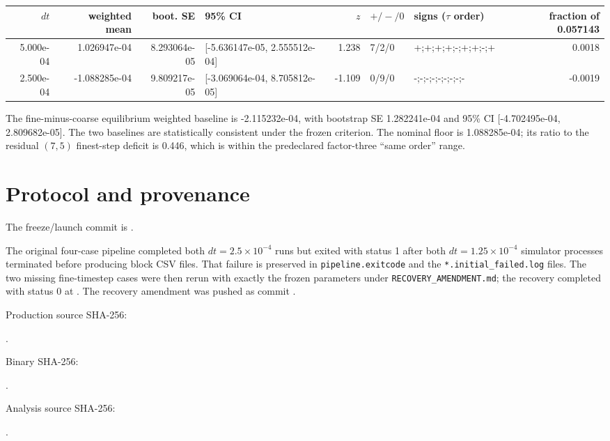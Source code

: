 \documentclass[10pt]{article}
\begin{document}
\begin{longtable}{r r r l r l l r}
\toprule
$dt$ & weighted mean & boot. SE & 95\% CI & $z$ & $+/-/0$ & signs ($\tau$ order) & fraction of 0.057143\\
\midrule
\endfirsthead
5.000e-04 & 1.026947e-04 & 8.293064e-05 & [-5.636147e-05, 2.555512e-04] & 1.238 & 7/2/0 & +;+;+;+;-;+;+;-;+ & 0.0018 \\
2.500e-04 & -1.088285e-04 & 9.809217e-05 & [-3.069064e-04, 8.705812e-05] & -1.109 & 0/9/0 & -;-;-;-;-;-;-;-;- & -0.0019 \\
\bottomrule
\end{longtable}
\normalsize

The fine-minus-coarse equilibrium weighted baseline is
-2.115232e-04, with bootstrap SE
1.282241e-04 and 95\% CI
[-4.702495e-04, 2.809682e-05].  The two baselines
are statistically consistent under the frozen criterion.
The nominal floor is 1.088285e-04; its
ratio to the residual $(7,5)$ finest-step deficit is
0.446, which is
within
the predeclared factor-three ``same order'' range.

\section{Protocol and provenance}
The freeze/launch commit is
.\par
The original four-case pipeline completed both $dt=2.5\times10^{-4}$ runs
but exited with status 1 after both $dt=1.25\times10^{-4}$ simulator
processes terminated before producing block CSV files.  That failure is
preserved in \texttt{pipeline.exitcode} and the
\texttt{*.initial\_failed.log} files.  The two missing fine-timestep cases
were then rerun with exactly the frozen parameters under
\texttt{RECOVERY\_AMENDMENT.md}; the recovery completed with status 0 at
.  The
recovery amendment was pushed as commit
.\par
Production source SHA-256:\par
{}.\par
Binary SHA-256:\par
{}.\par
Analysis source SHA-256:\par
{}.\par
\end{document}
